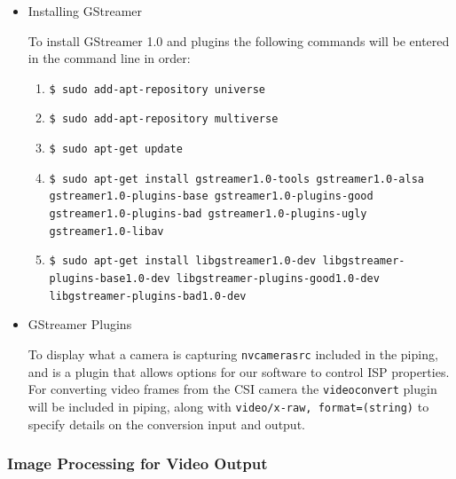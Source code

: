 \documentclass[letterpaper,10pt,serif,draftclsnofoot,onecolumn,compsoc,titlepage]{IEEEtran}
\begin{document}
\begin{itemize}
	\item Installing GStreamer 

To install GStreamer 1.0 and plugins the following commands will be entered in the 
command line in order\cite{GStmUG}: \\

	\begin{enumerate}
		\item\texttt{\$ sudo add-apt-repository universe} \\
		\item\texttt{\$ sudo add-apt-repository multiverse} \\
		\item\texttt{\$ sudo apt-get update} \\
		\item\texttt{\$ sudo apt-get install gstreamer1.0-tools gstreamer1.0-alsa 
			gstreamer1.0-plugins-base \newline gstreamer1.0-plugins-good 
			gstreamer1.0-plugins-bad gstreamer1.0-plugins-ugly \newline
			gstreamer1.0-libav} \\
		\item\texttt{\$ sudo apt-get install libgstreamer1.0-dev libgstreamer-plugins-base1.0-dev \newline
		libgstreamer-plugins-good1.0-dev libgstreamer-plugins-bad1.0-dev} \\
	\end{enumerate}

	\item GStreamer Plugins

To display what a camera is capturing \texttt{nvcamerasrc} included in the piping, 
and is a plugin that allows options for our software to control ISP properties. \\

For converting video frames from the CSI camera the \texttt{videoconvert} plugin will 
be included in piping, along with \texttt{video/x-raw, format=(string){}} to specify 
details on the conversion input and output. \\

\end{itemize}

\subsubsection{Image Processing for Video Output}
\end{document}
